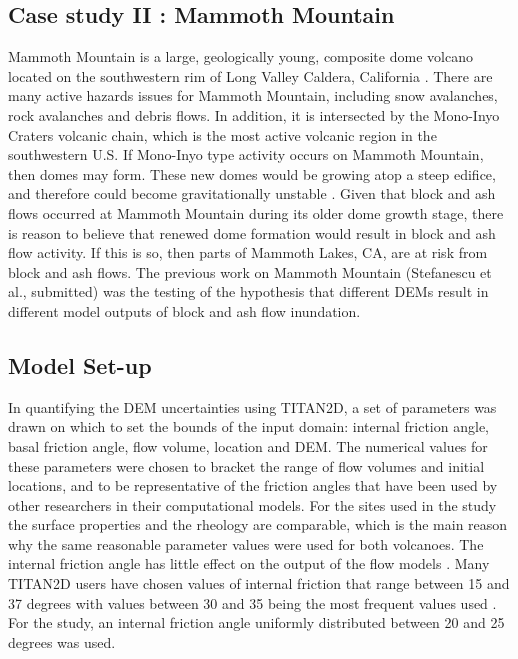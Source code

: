 \documentclass[12pt]{article}
\begin{document}
\subsection{Case study II : Mammoth Mountain}

Mammoth Mountain is a large, geologically young, composite dome
volcano located on the southwestern rim of Long Valley Caldera,
California \citep{Bailey1989}.  There are many active hazards issues
for Mammoth Mountain, including snow avalanches, rock avalanches and
debris flows. In addition, it is intersected by the Mono-Inyo Craters
volcanic chain, which is the most active volcanic region in the
southwestern U.S.  If Mono-Inyo type activity occurs on Mammoth
Mountain, then domes may form.  These new domes would be growing atop
a steep edifice, and therefore could become gravitationally unstable \citep{Wes2004169, Smith_Mammoth}.
Given that block and ash flows occurred at Mammoth Mountain during its
older dome growth stage, there is reason to believe that renewed dome
formation would result in block and ash flow activity. If this is so,
then parts of Mammoth Lakes, CA, are at risk from block and ash flows.
The previous work on Mammoth Mountain (Stefanescu et al., submitted)
was the testing of the hypothesis that different DEMs result in
different model outputs of block and ash flow inundation.

\subsection{Model Set-up}
\label{subsec: Model Set-up}
In quantifying the DEM uncertainties using TITAN2D, a set
of parameters was drawn on which to set the bounds of the input
domain: internal friction angle, basal friction angle, flow volume,
location and DEM. The numerical values for these parameters were
chosen to bracket the range of flow volumes and initial locations, and
to be representative of the friction angles that have been used by
other researchers in their computational models. 
For the sites used in the study the surface properties and the rheology are 
comparable, which is the main reason why the same reasonable
parameter values were used for both volcanoes.%
The internal friction angle has little effect on the output of the flow
models \citep{Keith, sheridan_2005}. Many TITAN2D users have chosen
values of internal friction that range between 15 and 37 degrees with
values between 30 and 35 being the most frequent values used
\citep{Patra2005, murcia_2010}.  For the study, an internal
friction angle uniformly distributed between 20 and 25 degrees was used.
\end{document}
